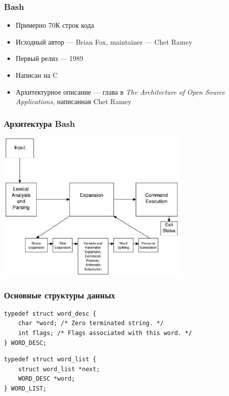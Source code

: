 \documentclass{../text-style}
\begin{document}
    \begin{frame}
        \frametitle{Bash}
        \begin{itemize}
            \item Примерно 70К строк кода
            \item Исходный автор --- Brian Fox, maintainer --- Chet Ramey
            \item Первый релиз --- 1989
            \item Написан на C
            \item Архитектурное описание --- глава в \textit{The Architecture of Open Source Applications}, написанная Chet Ramey
        \end{itemize}
    \end{frame}

    \begin{frame}
        \frametitle{Архитектура Bash}
        \begin{center}
            \includegraphics[width=0.7\textwidth]{bashArchitecture.png}
        \end{center}
    \end{frame}

    \begin{frame}[fragile]
        \frametitle{Основные структуры данных}
        \begin{verbatim}
typedef struct word_desc {
    char *word; /* Zero terminated string. */
    int flags; /* Flags associated with this word. */
} WORD_DESC;
        \end{verbatim}

        \vspace{3mm}

        \begin{verbatim}
typedef struct word_list {
    struct word_list *next;
    WORD_DESC *word;
} WORD_LIST;
        \end{verbatim}
    \end{frame}
\end{document}
